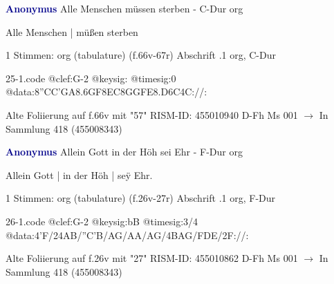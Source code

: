 \documentclass[twocolumn]{book}
\begin{document}
\newline \par \vspace{7pt} \textcolor{darkblue}{\textbf{Anonymus  }}
\newline Alle Menschen müssen sterben - C-Dur
\newline org
\newline \begin{itshape}[f.66v, at left:] Alle Menschen | müßen sterben\end{itshape} 
\newline \textcolor{darkblue}{}  1 Stimmen: org (tabulature)  (f.66v-67r)
\newline Abschrift
.1  org, C-Dur  
\begin{filecontents*}{25-1.code}
@clef:G-2
@keysig:
@timesig:0
@data:{8''CC'GA}{8.6GF8EC}{8GGFE}{8.D6C}4C://:
\end{filecontents*}
\newline
%
\newline Alte Foliierung auf f.66v mit "57"
\newline RISM-ID: 455010940
\newline D-Fh  Ms 001
\newline $\rightarrow$ In Sammlung 418 (455008343)
      
\newline \par \vspace{7pt} \textcolor{darkblue}{\textbf{Anonymus  }}
\newline Allein Gott in der Höh sei Ehr - F-Dur
\newline org
\newline \begin{itshape}[f.26v, at left:] Allein Gott | in der Höh | seÿ Ehr.\end{itshape} 
\newline \textcolor{darkblue}{}  1 Stimmen: org (tabulature)  (f.26v-27r)
\newline Abschrift
.1  org, F-Dur  
\begin{filecontents*}{26-1.code}
@clef:G-2
@keysig:bB
@timesig:3/4
@data:4'F/24AB/''C'B/AG/AA/AG/4BAG/FDE/2F://:
\end{filecontents*}
\newline
%
\newline Alte Foliierung auf f.26v mit "27"
\newline RISM-ID: 455010862
\newline D-Fh  Ms 001
\newline $\rightarrow$ In Sammlung 418 (455008343)
      
\end{document}
